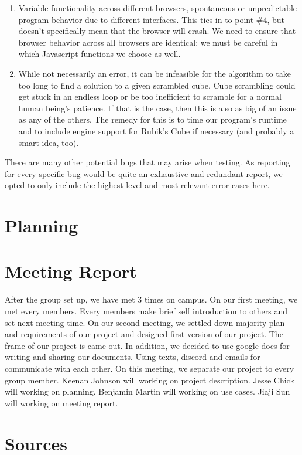 \documentclass[12pt]{article}
\begin{document}
\begin{enumerate}
\item Variable functionality across different browsers, spontaneous or unpredictable program behavior due to different interfaces. This ties in to point \#4, but doesn’t specifically mean that the browser will crash. We need to ensure that browser behavior across all browsers are identical; we must be careful in which Javascript functions we choose as well.
\item While not necessarily an error, it can be infeasible for the algorithm to take too long to find a solution to a given scrambled cube. Cube scrambling could get stuck in an endless loop or be too inefficient to scramble for a normal human being’s patience. If that is the case, then this is also as big of an issue as any of the others. The remedy for this is to time our program’s runtime and to include engine support for Rubik’s Cube if necessary (and probably a smart idea, too).
\end{enumerate}
\par
There are many other potential bugs that may arise when testing. As reporting for every specific bug would be quite an exhaustive and redundant report, we opted to only include the highest-level and most relevant error cases here. \\

\section{Planning}


\section{Meeting Report}
\par
After the group set up, we have met 3 times on campus.  On our first meeting, we met every members. Every members make brief self introduction to others and set next meeting time. On our second meeting, we settled down majority plan and requirements of our project and designed first version of our project. The frame of our project is came out. In addition, we decided to use google docs for writing and sharing our documents. Using texts, discord and emails for communicate with each other. On this meeting, we separate our project to every group member. Keenan Johnson will working on project description. Jesse Chick will working on planning. Benjamin Martin will working on use cases. Jiaji Sun will working on meeting report. \\

\section{Sources}
\end{document}
